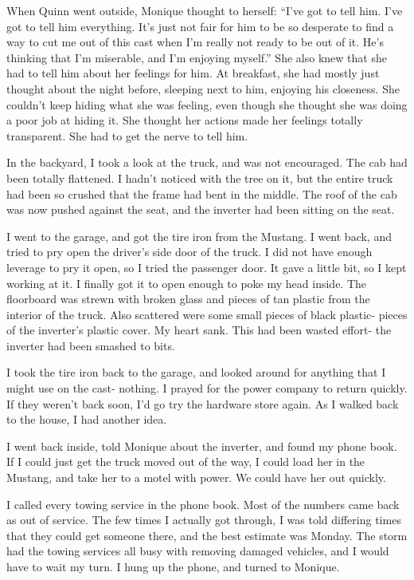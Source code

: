 \begin{thought}
When Quinn went outside, Monique thought to herself: ``I've got to tell him. I've got to
tell him everything. It's just not fair for him to be so desperate to find a way to cut me out
of this cast when I'm really not ready to be out of it. He's thinking that I'm miserable, and
I'm enjoying myself.'' She also knew that she had to tell him about her feelings for him. At
breakfast, she had mostly just thought about the night before, sleeping next to him, enjoying
his closeness. She couldn't keep hiding what she was feeling, even though she thought she was
doing a poor job at hiding it. She thought her actions made her feelings totally transparent.
She had to get the nerve to tell him.
\end{thought}

In the backyard, I took a look at the truck, and was not encouraged. The cab had been
totally flattened. I hadn't noticed with the tree on it, but the entire truck had been so
crushed that the frame had bent in the middle. The roof of the cab was now pushed against the
seat, and the inverter had been sitting on the seat.

I went to the garage, and got the tire iron from the Mustang. I went back, and tried to
pry open the driver's side door of the truck. I did not have enough leverage to pry it open, so
I tried the passenger door. It gave a little bit, so I kept working at it. I finally got it to
open enough to poke my head inside. The floorboard was strewn with broken glass and pieces of
tan plastic from the interior of the truck. Also scattered were some small pieces of black
plastic- pieces of the inverter's plastic cover. My heart sank. This had been wasted effort- the
inverter had been smashed to bits.

I took the tire iron back to the garage, and looked around for anything that I might use on
the cast- nothing. I prayed for the power company to return quickly. If they weren't back soon,
I'd go try the hardware store again. As I walked back to the house, I had another idea.

I went back inside, told Monique about the inverter, and found my phone book. If I could
just get the truck moved out of the way, I could load her in the Mustang, and take her to a
motel with power. We could have her out quickly.

I called every towing service in the phone book. Most of the numbers came back as out of
service. The few times I actually got through, I was told differing times that they could get
someone there, and the best estimate was Monday. The storm had the towing services all busy with
removing damaged vehicles, and I would have to wait my turn. I hung up the phone, and turned to
Monique.


